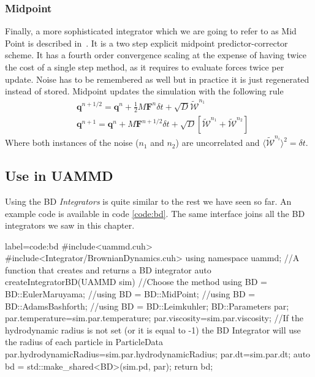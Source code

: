 \documentclass[twoside,openright,titlepage,numbers=noenddot,%
headinclude,footinclude,cleardoublepage=empty,abstract=on,
BCOR=5mm,fontsize=11pt, dvipsnames, paper=b5
]{scrreprt}
\renewcommand{\vec}[1]{\bm{#1}}
\newcommand{\dt}{\delta t}
\newcommand{\half}{\frac{1}{2}}
\newcommand{\noise}{\widetilde{W}}
\newcommand{\ppos}{q}
\begin{document}
\subsubsection*{Midpoint}
Finally, a more sophisticated integrator which we are going to refer to as Mid Point is described in~\cite{Delong2013}. 
It is a two step explicit midpoint predictor-corrector scheme. It has a fourth order convergence scaling at the expense of having twice the cost of a single step method, as it requires to evaluate forces twice per update. Noise has to be remembered as well but in practice it is just regenerated instead of stored.
Midpoint updates the simulation with the following rule
\begin{equation}
  \begin{aligned}
    &\vec{\ppos}^{n+1/2} = \vec{\ppos}^n + \half M\vec{F}^n\dt + \sqrt{D}\vec{\mathcal{\noise}}^{n_1}\\
    &\vec{\ppos}^{n+1} = \vec{\ppos}^n + M\vec{F}^{n+1/2}\dt + \sqrt{D}\left[\vec{\mathcal{\noise}}^{n_1}  + \vec{\mathcal{\noise}}^{n_2}\right]
  \end{aligned}
\end{equation}
Where both instances of the noise ($n_1$ and $n_2$) are uncorrelated and $\langle \mathcal{\noise}^{n_i}\rangle^2 = \dt$.
\subsection*{Use in UAMMD}
Using the \gls{BD} \emph{Integrators} is quite similar to the rest we have seen so far. An example code is available in code \ref{code:bd}. The same interface joins all the \gls{BD} integrators we saw in this chapter.
\begin{code2}{label=code:bd}
#include<uammd.cuh>
#include<Integrator/BrownianDynamics.cuh>
using namespace uammd;
//A function that creates and returns a BD integrator
auto createIntegratorBD(UAMMD sim){   
  //Choose the method
  using BD = BD::EulerMaruyama;
  //using BD = BD::MidPoint;
  //using BD = BD::AdamsBashforth;
  //using BD = BD::Leimkuhler;
  BD::Parameters par;
  par.temperature=sim.par.temperature;
  par.viscosity=sim.par.viscosity;
  //If the hydrodynamic radius is not set (or it is equal to -1) the BD Integrator will use the radius of each particle in ParticleData
  par.hydrodynamicRadius=sim.par.hydrodynamicRadius;
  par.dt=sim.par.dt;
  auto bd = std::make_shared<BD>(sim.pd, par);
  return bd;
}
\end{code2}
\end{document}
